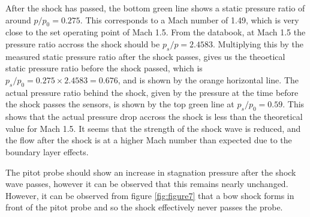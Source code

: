 \documentclass[8pt]{article}
\begin{document}
After the shock has passed, the bottom green line shows a static pressure ratio of around $p/p_0 = 0.275$. This corresponds to a Mach number of 1.49, which is very close to the set operating point of Mach 1.5.
From the databook, at Mach 1.5 the pressure ratio accross the shock should be $p_s/p = 2.4583$.
Multiplying this by the measured static pressure ratio after the shock passes, gives us the theoetical static pressure ratio before the shock passed, which is $p_s/p_0 = 0.275 \times 2.4583 = 0.676$, and is shown by the orange horizontal line.
The actual pressure ratio behind the shock, given by the pressure at the time before the shock passes the sensors, is shown by the top green line at $p_s/p_0 = 0.59$.
This shows that the actual pressure drop accross the shock is less than the theoretical value for Mach 1.5.
It seems that the strength of the shock wave is reduced, and the flow after the shock is at a higher Mach number than expected due to the boundary layer effects.

The pitot probe should show an increase in stagnation pressure after the shock wave passes, however it can be observed that this remains nearly unchanged.
However, it can be observed from figure \ref{fig:figure7} that a bow shock forms in front of the pitot probe and so the shock effectively never passes the probe.
\end{document}
